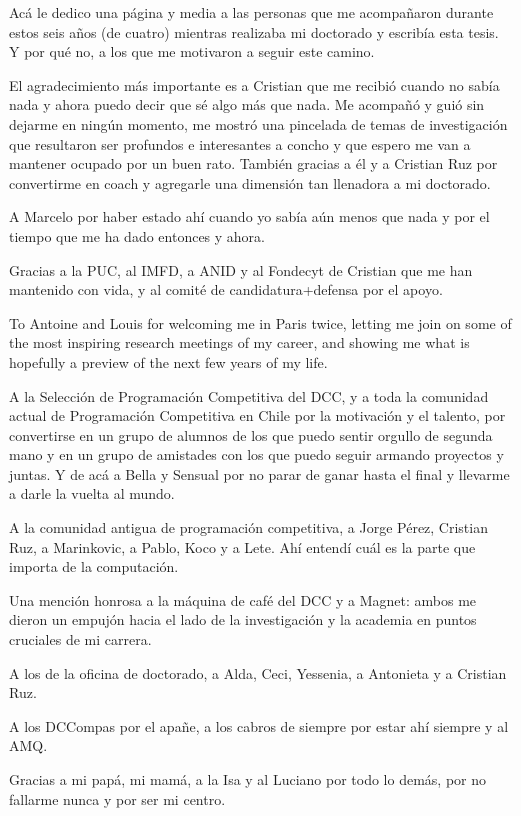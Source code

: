 Acá le dedico una página y media a las personas que me acompañaron durante estos seis años (de cuatro) mientras realizaba mi doctorado y escribía esta tesis. Y por qué no, a los que me motivaron a seguir este camino.

El agradecimiento más importante es a Cristian que me recibió cuando no sabía nada y ahora puedo decir que sé algo más que nada. Me acompañó y guió sin dejarme en ningún momento, me mostró una pincelada de temas de investigación que resultaron ser profundos e interesantes a concho y que espero me van a mantener ocupado por un buen rato. También gracias a él y a Cristian Ruz por convertirme en coach y agregarle una dimensión tan llenadora a mi doctorado.

A Marcelo por haber estado ahí cuando yo sabía aún menos que nada y por el tiempo que me ha dado entonces y ahora.

Gracias a la PUC, al IMFD, a ANID y al Fondecyt de Cristian que me han mantenido con vida, y al comité de candidatura+defensa por el apoyo.

To Antoine and Louis for welcoming me in Paris twice, letting me join on some of the most inspiring research meetings of my career, and showing me what is hopefully a preview of the next few years of my life.

A la Selección de Programación Competitiva del DCC, y a toda la comunidad actual de Programación Competitiva en Chile por la motivación y el talento, por convertirse en un grupo de alumnos de los que puedo sentir orgullo de segunda mano y en un grupo de amistades con los que puedo seguir armando proyectos y juntas. 
Y de acá a Bella y Sensual por no parar de ganar hasta el final y llevarme a darle la vuelta al mundo.

A la comunidad antigua de programación competitiva, a Jorge Pérez, Cristian Ruz, a Marinkovic, a Pablo, Koco y a Lete. Ahí entendí cuál es la parte que importa de la computación.

Una mención honrosa a la máquina de café del DCC y a Magnet: ambos me dieron un empujón hacia el lado de la investigación y la academia en puntos cruciales de mi carrera.

A los de la oficina de doctorado, a Alda, Ceci, Yessenia, a Antonieta y a Cristian Ruz.

A los DCCompas por el apañe, a los cabros de siempre por estar ahí siempre y al AMQ.

Gracias a mi papá, mi mamá, a la Isa y al Luciano por todo lo demás, por no fallarme nunca y por ser mi centro.